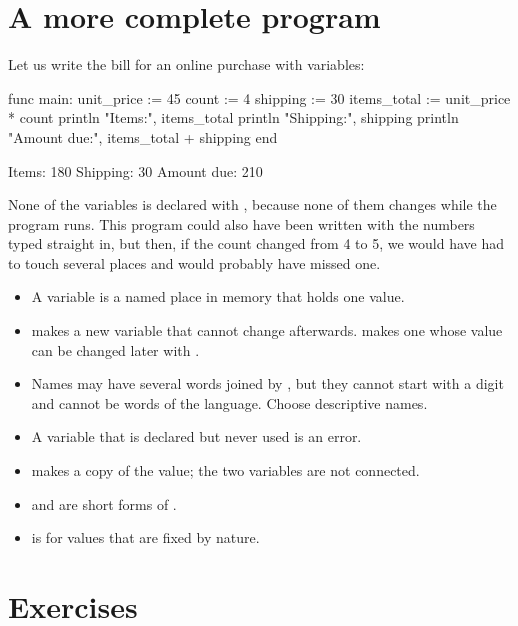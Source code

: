 \section{A more complete program}

Let us write the bill for an online purchase with variables:

\begin{salamcode}
func main:
    unit_price := 45
    count := 4
    shipping := 30
    items_total := unit_price * count
    println "Items:", items_total
    println "Shipping:", shipping
    println "Amount due:", items_total + shipping
end
\end{salamcode}

\begin{salamout}
Items: 180
Shipping: 30
Amount due: 210
\end{salamout}

None of the variables is declared with , because none of them
changes while the program runs. This program could also have been written
with the numbers typed straight in, but then, if the count changed from 4 to
5, we would have had to touch several places and would probably have missed
one.

\begin{summary}
\begin{itemize}
  \item A variable is a named place in memory that holds one value.
  \item {} makes a new variable that cannot change
        afterwards.  makes one whose value can be
        changed later with \code{=}.
  \item Names may have several words joined by \code{\_}, but they cannot start with a digit
        and cannot be words of the language. Choose descriptive names.
  \item A variable that is declared but never used is an error.
  \item {} makes a copy of the value; the two variables are not
        connected.
  \item {} and  are short forms of
        .
  \item {} is for values that are fixed by nature.
\end{itemize}
\end{summary}

\section*{Exercises}

